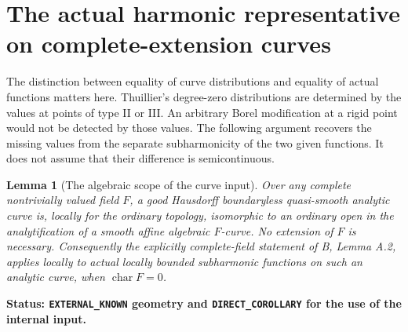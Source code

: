\documentclass[11pt,a4paper]{article}
\numberwithin{equation}{section}
\newtheorem{lemma}[theorem]{Lemma}
\theoremstyle{definition}
\theoremstyle{remark}
\begin{document}


\section{The actual harmonic representative on complete-extension curves}
\label{sec:r5-curve-kernel-actual}

The distinction between equality of curve distributions and equality
of actual functions matters here.  Thuillier's degree-zero
distributions are determined by the values at points of type II or
III.  An arbitrary Borel modification at a rigid point would not be
detected by those values.  The following argument recovers the missing
values from the separate subharmonicity of the two given functions.
It does not assume that their difference is semicontinuous.

\begin{lemma}[The algebraic scope of the curve input]
\label{lem:r5-curve-local-algebraization}
Over any complete nontrivially valued field $F$, a good Hausdorff
boundaryless quasi-smooth analytic curve is, locally for the ordinary
topology, isomorphic to an ordinary open in the analytification of a
smooth affine algebraic $F$-curve.  No extension of $F$ is necessary.
Consequently the explicitly complete-field statement of B, Lemma A.2,
applies locally to actual locally bounded subharmonic functions on such
an analytic curve, when $\operatorname{char}F=0$.
\end{lemma}

\noindent\textbf{Status: \texttt{EXTERNAL\_KNOWN} geometry and
\texttt{DIRECT\_COROLLARY} for the use of the internal input.}
\end{document}
